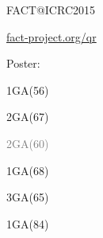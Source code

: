 \documentclass[t]{beamer}
\begin{document}
\begin{columns}[t, onlytextwidth]
\begin{column}{0.16\textwidth}
\begin{block}[equal height group=bottom]{\normalsize FACT@ICRC2015}
\begin{multicols}{2}
        {\tiny\vspace{0.25cm}\url{fact-project.org/qr}\par}
        \columnbreak
        Poster:
        \begin{description}[align=right, labelwidth=1.3cm, nosep]
          \item[706] 1GA(56)
          \item[707] 2GA(67)
          \item[\textcolor{gray}{733}] \textcolor{gray}{2GA(60)}
          \item[863] 1GA(68)
          \item[865] 3GA(65)
          \item[976] 1GA(84)
        \end{description}
      \end{multicols}
    \end{block}
  \end{column}%
\end{columns}%
\end{document}
